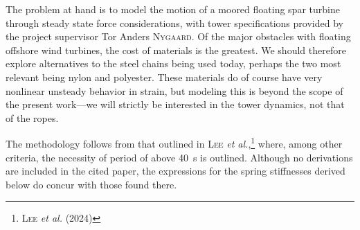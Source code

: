 The problem at hand is to model the motion of a moored floating spar turbine through steady state force considerations, with tower specifications provided by the project supervisor Tor Anders \textsc{Nygaard}.
Of the major obstacles with floating offshore wind turbines, the cost of materials is the greatest.
We should therefore explore alternatives to the steel chains being used today, perhaps the two most relevant being nylon and polyester.
These materials do of course have very nonlinear unsteady behavior in strain, but modeling this is beyond the scope of the present work---we will strictly be interested in the tower dynamics, not that of the ropes.

The methodology follows from that outlined in \textsc{Lee} \emph{et al.},\footnote{\cite{lee2024design} \textsc{Lee} \emph{et al.} (2024)} where, among other criteria, the necessity of period of above \SI{40}{\second} is outlined.
Although no derivations are included in the cited paper, the expressions for the spring stiffnesses derived below do concur with those found there.
